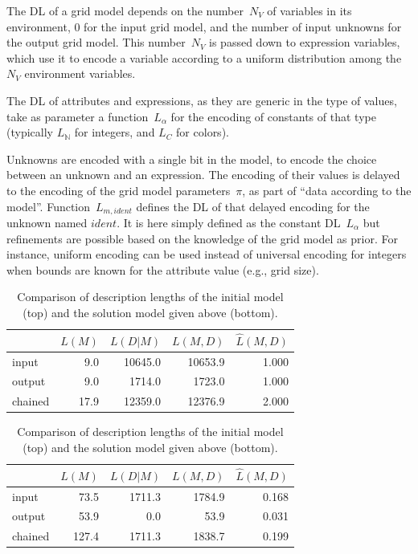 \documentclass[a4paper]{llncs}
\newcommand{\nat}{\mathbb{N}}
\begin{document}
{The DL of a grid model depends on the number~$N_V$ of variables in its
environment, 0 for the input grid model, and the number of input
unknowns for the output grid model. This number~$N_V$ is passed down
to expression variables, which use it to encode a variable according to a
uniform distribution among the $N_V$ environment variables.

The DL of attributes and expressions, as they are generic in the type
of values, take as parameter a function~$L_\alpha$ for the encoding of
constants of that type (typically $L_\nat$ for integers, and $L_C$ for
colors).

Unknowns are encoded with a single bit in the model, to encode the
choice between an unknown and an expression. The encoding of their
values is delayed to the encoding of the grid model parameters~$\pi$,
as part of ``data according to the model''.  Function~$L_{m,ident}$
defines the DL of that delayed encoding for the unknown named
$ident$. It is here simply defined as the constant DL~$L_\alpha$ but
refinements are possible based on the knowledge of the grid model as
prior. For instance, uniform encoding can be used instead of universal
encoding for integers when bounds are known for the attribute value
(e.g., grid size).
}%

\begin{table}[t]
  \centering
  \caption{Comparison of description lengths of the initial model (top) and the solution model given above (bottom).}
    \begin{center}
      \begin{tabular}{|l||r|r||r|r|}
    \hline
          & $L(M)$ & $L(D|M)$ & $L(M,D)$ & $\hat{L}(M,D)$ \\
    \hline
    \hline
    input & 9.0 & 10645.0 & 10653.9 & 1.000 \\
    \hline
    output & 9.0 & 1714.0 & 1723.0 & 1.000 \\
    \hline
    \hline
    chained & 17.9 & 12359.0 & 12376.9 & 2.000 \\
    \hline
      \end{tabular}
    \end{center}
  \begin{center}
    \begin{tabular}{|l||r|r||r|r|}
    \hline
      & $L(M)$ & $L(D|M)$ & $L(M,D)$ & $\hat{L}(M,D)$ \\
    \hline
    \hline
    input & 73.5 & 1711.3 & 1784.9 & 0.168 \\
    \hline
    output & 53.9 & 0.0 & 53.9 & 0.031 \\
    \hline
    \hline
    chained & 127.4 & 1711.3 & 1838.7 & 0.199 \\
    \hline
    \end{tabular}
  \end{center}
\label{tab:dl:example}
\end{table}
\end{document}
